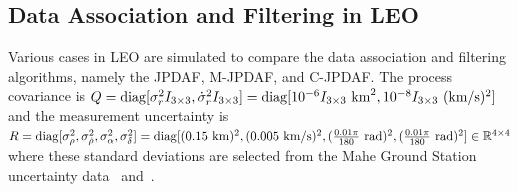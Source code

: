 
\subsection{Data Association and Filtering in LEO}

Various cases in LEO are simulated to compare the data association and filtering algorithms, namely the JPDAF, M-JPDAF, and C-JPDAF.
The process covariance is $Q=\diag[\sigma^2_rI_{3\times3},\dot\sigma^2_rI_{3\times3}]=\diag[10^{-6}I_{3\times3}\ \text{km}^2, 10^{-8}I_{3\times3}\ (\text{km/s})^2]$ and the measurement uncertainty is $R=\diag[\sigma_\rho^2, \sigma_{\dot\rho}^2, \sigma_\alpha^2, \sigma_\delta^2]=\diag[(0.15\ \text{km})^2, (0.005\ \text{km/s})^2,\\ (\frac{0.01\pi}{180}\ \text{rad})^2, (\frac{0.01\pi}{180}\ \text{rad})^2]\in\Re^{4\times4}$ where these standard deviations are selected from the Mahe Ground Station uncertainty data~\cite{VerSauSco04} and~\cite{KurAriAriEfe10}.

